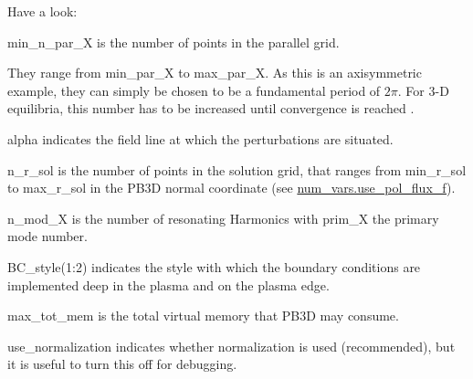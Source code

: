 Have a look\+:
\begin{DoxyItemize}
\item {\ttfamily min\+\_\+n\+\_\+par\+\_\+X} is the number of points in the parallel grid.
\item They range from {\ttfamily min\+\_\+par\+\_\+X} to {\ttfamily max\+\_\+par\+\_\+X}. As this is an axisymmetric example, they can simply be chosen to be a fundamental period of $ 2\pi $. For 3-\/D equilibria, this number has to be increased until convergence is reached \cite{Weyens2017PB3D}.
\item {\ttfamily alpha} indicates the field line at which the perturbations are situated.
\item {\ttfamily n\+\_\+r\+\_\+sol} is the number of points in the solution grid, that ranges from {\ttfamily min\+\_\+r\+\_\+sol} to {\ttfamily max\+\_\+r\+\_\+sol} in the P\+B3D normal coordinate (see \hyperlink{namespacenum__vars_ae21ec57b791e369c3558c0eb3da1555b}{num\+\_\+vars.\+use\+\_\+pol\+\_\+flux\+\_\+f}).
\item {\ttfamily n\+\_\+mod\+\_\+X} is the number of resonating Harmonics with {\ttfamily prim\+\_\+X} the primary mode number.
\item {\ttfamily B\+C\+\_\+style(1\+:2)} indicates the style with which the boundary conditions are implemented deep in the plasma and on the plasma edge.
\item {\ttfamily max\+\_\+tot\+\_\+mem} is the total virtual memory that P\+B3D may consume.
\item {\ttfamily use\+\_\+normalization} indicates whether normalization is used (recommended), but it is useful to turn this off for debugging.
\end{DoxyItemize}


